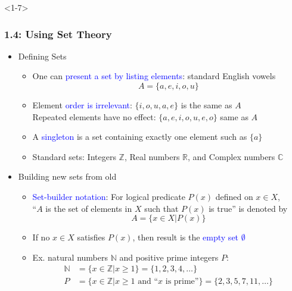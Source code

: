 \documentclass[10pt,english,aspectratio=169]{beamer}
\begin{document}
\begin{frame}<1-7> \frametitle{1.4: Using Set Theory}

\begin{itemize}
\setlength\itemsep{2.5mm}
\item<1-> Defining Sets \vspace{1mm}
\begin{itemize} 
  \setlength\itemsep{1.5mm}
  \item<1-> One can \textcolor{blue}{present a set by listing elements}: standard English vowels \[A= \{ a,e,i,o,u \} \]
  \item<2-> Element \textcolor{blue}{order is irrelevant}: $\{ i,o,u,a,e \}$ is the same as $A$ \\ Repeated elements have no effect: $\{ a,e,i,o,u,e,o \}$ same as $A$
  \item<3-> A \textcolor{blue}{singleton} is a set containing exactly one element such as $\{a\}$
  \item<4-> Standard sets: Integers $\mathbb{Z}$, Real numbers $\mathbb{R}$, and Complex numbers $\mathbb{C}$
\end{itemize}

\item<5-> Building new sets from old \vspace{1mm}
\begin{itemize} 
  \setlength\itemsep{1mm}
  \item \textcolor{blue}{Set-builder notation}: For logical predicate $P(x)$ defined on $x\in X$,\\  ``$A$ is the set of elements in $X$ such that $P(x)$ is true'' is denoted by
\[ A = \{ x\in X | P(x) \} \]
  \item<6-> If no $x\in X$ satisfies $P(x)$, then result is the \textcolor{blue}{empty set $\emptyset$}
  \item<7-> Ex. natural numbers $\mathbb{N}$ and positive prime integers $P$:
\begin{align*}
  \mathbb{N} &= \{ x\in \mathbb{Z} | x\geq 1 \} = \{ 1,2,3,4,\ldots \} \\
  P &= \{ x\in \mathbb{Z} | x\geq 1 \textrm{ and ``}x\textrm{ is prime''} \} = \{ 2,3,5,7,11,\ldots \}
\end{align*}
\end{itemize}
\end{itemize}


\end{frame}
\end{document}

